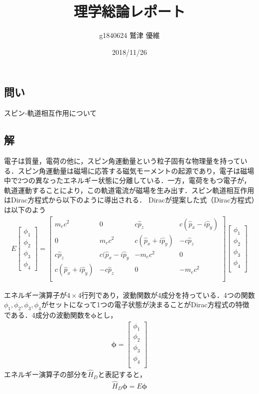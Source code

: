 \documentclass[10pt]{ujarticle}
\title{理学総論レポート}
\author{g1840624 鷲津 優維}
\date{2018/11/26}
\begin{document}
\maketitle
\section{}
\subsection{問い}
スピン-軌道相互作用について

\subsection{解}
電子は質量，電荷の他に，スピン角運動量という粒子固有な物理量を持っている．スピン角運動量は磁場に応答する磁気モーメントの起源であり，電子は磁場中で2つの異なったエネルギー状態に分離している．一方，電荷をもつ電子が，軌道運動することにより，この軌道電流が磁場を生み出す．スピン軌道相互作用はDirac方程式から以下のように導出される．
Diracが提案した式（Dirac方程式）は以下のよう
\begin{eqnarray}
E
\left[
\begin{array}{c}
 \phi_1 \\
 \phi_2 \\
 \phi_3 \\
 \phi_4 
\end{array}
\right]
=
\left[
 \begin{array}{cccc}
   m_e c^2 & 0 & c\hat{p}_z & c(\hat{p}_x-i\hat{p}_y) \\
   0 & m_e c^2 & c(\hat{p}_x+i\hat{p}_y)&-c\hat{p}_z \\
   c\hat{p}_z & c(\hat{p}_x -i\hat{p}_y & -m_e c^2 & 0 \\
   c(\hat{p}_x + i\hat{p}_y) & -c\hat{p}_z & 0 & -m_e c^2 \\
 \end{array}
\right]
\left[
\begin{array}{c}
 \phi_1 \\
 \phi_2 \\
 \phi_3 \\
 \phi_4 \\
\end{array}
\right]
\end{eqnarray}

エネルギー演算子が$4\times4$行列であり，波動関数が4成分を持っている．4つの関数$\phi_1, \phi_2, \phi_3, \phi_4$がセットになって1つの電子状態が決まることがDirac方程式の特徴である．4成分の波動関数を$\bm{\phi}$とし，
\begin{eqnarray}
\bm{\phi}
=
\left[
\begin{array}{c}
 \phi_1 \\
 \phi_2 \\
 \phi_3 \\
 \phi_4 \\
\end{array}
\right]
\end{eqnarray}
エネルギー演算子の部分を$\hat{H}_D$と表記すると，
\begin{eqnarray}
\hat{H}_D \bm{\phi} = E \bm{\phi}
\end{eqnarray}
\end{document}
